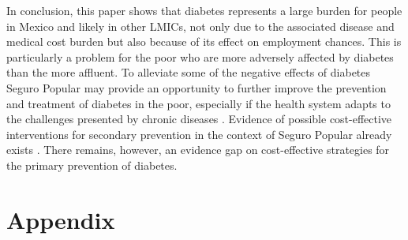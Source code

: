 In conclusion, this paper shows that diabetes represents
a large burden for people in Mexico and likely in other \acp{LMIC},
not only due to the associated disease and medical cost burden but
also because of its effect on employment chances. This is particularly
a problem for the poor who are more adversely affected by diabetes
than the more affluent. To alleviate some of the negative effects
of diabetes Seguro Popular may provide an opportunity to further improve
the prevention and treatment of diabetes in the poor, especially if
the health system adapts to the challenges presented by chronic diseases
\parencite{Samb2010}. Evidence of possible cost-effective interventions
for secondary prevention in the context of Seguro Popular already
exists \parencite{Salomon2012}. There remains, however, an evidence gap
on cost-effective strategies for the primary prevention of diabetes.

\clearpage


\section*{Appendix}



